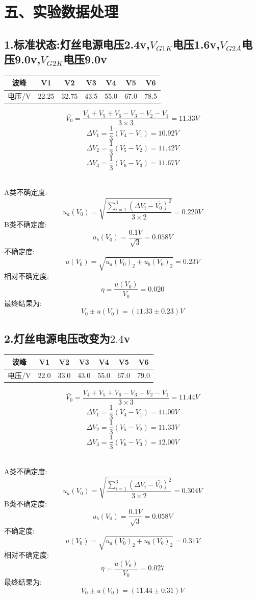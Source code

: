 \documentclass[11pt,a4paper,oneside]{article}
\begin{document}
\section*{五、实验数据处理}
\subsection*{1.标准状态:灯丝电源电压2.4v,$V_{G1K}$电压1.6v,$V_{G2A}$电压9.0v,$V_{G2K}$电压9.0v}
\begin{center}
\begin{tabular}{|c|c|c|c|c|c|c|}
	\hline
	波峰&V1&V2&V3&V4&V5&V6
	\\\hline
	电压/V&22.25&32.75&43.5&55.0&67.0&78.5\\\hline
	\end{tabular}
	\end{center}

$$  \bar{V_0}=\frac{V_4+V_5+V_6-V_3-V_2-V_1}{3\times 3}=11.33V $$
$$	\Delta V_1=\frac{1}{3}(V_4-V_1)=10.92V $$
$$	\Delta V_2=\frac{1}{3}(V_5-V_2)=11.42V $$
$$	\Delta V_3=\frac{1}{3}(V_6-V_3)=11.67V $$ 

\ \\
A类不确定度:
$$	u_a(V_0)=\sqrt{\frac{\sum\limits_{i=1}^{3} (\Delta V_i-\bar{V_0})^2}{3\times 2}}=0.220V $$
B类不确定度:
$$	u_b(V_0)=\frac{0.1V}{\sqrt{3}}=0.058V $$
不确定度:
$$	u(V_0)=\sqrt{u_a(V_0)_2+u_b(V_0)_2}=0.23V $$
相对不确定度:
$$	\eta=\frac{u(V_0)}{V_0}=0.020 $$
最终结果为:
$$	V_0 \pm u(V_0) = (11.33 \pm 0.23)V $$


\subsection*{2.灯丝电源电压改变为$2.4$v}
\begin{center}
\begin{tabular}{|c|c|c|c|c|c|c|}
	\hline
	波峰&V1&V2&V3&V4&V5&V6
	\\\hline
	电压/V&22.0&33.0&43.0&55.0&67.0&79.0\\\hline
	\end{tabular}
	\end{center}

$$  \bar{V_0}=\frac{V_4+V_5+V_6-V_3-V_2-V_1}{3\times 3}=11.44V $$
$$	\Delta V_1=\frac{1}{3}(V_4-V_1)=11.00V $$
$$	\Delta V_2=\frac{1}{3}(V_5-V_2)=11.33V $$
$$	\Delta V_3=\frac{1}{3}(V_6-V_3)=12.00V $$ 

\ \\
A类不确定度:
$$	u_a(V_0)=\sqrt{\frac{\sum\limits_{i=1}^{3} (\Delta V_i-\bar{V_0})^2}{3\times 2}}=0.304V $$
B类不确定度:
$$	u_b(V_0)=\frac{0.1V}{\sqrt{3}}=0.058V $$
不确定度:
$$	u(V_0)=\sqrt{u_a(V_0)_2+u_b(V_0)_2}=0.31V $$
相对不确定度:
$$	\eta=\frac{u(V_0)}{V_0}=0.027 $$
最终结果为:
$$	V_0 \pm u(V_0) = (11.44 \pm 0.31)V $$
\end{document}
